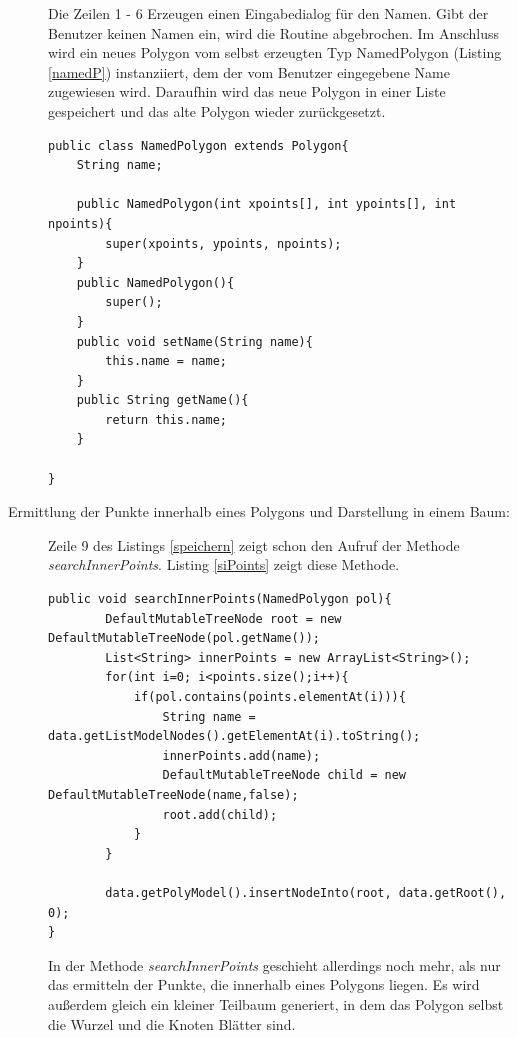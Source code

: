 \begin{description}
Die Zeilen 1 - 6 Erzeugen einen Eingabedialog für den Namen. Gibt der Benutzer keinen Namen ein, wird die Routine abgebrochen. Im Anschluss wird ein neues Polygon vom selbst erzeugten Typ NamedPolygon (Listing \ref{namedP}) instanziiert, dem der vom Benutzer eingegebene Name zugewiesen wird. Daraufhin wird das neue Polygon in einer Liste gespeichert und das alte Polygon wieder zurückgesetzt. 
\begin{lstlisting}[captionpos=b, caption=Klassendefinition des NamedPolygon, label=namedP]
public class NamedPolygon extends Polygon{
    String name;

    public NamedPolygon(int xpoints[], int ypoints[], int npoints){
        super(xpoints, ypoints, npoints);
    }
    public NamedPolygon(){
        super();
    }
    public void setName(String name){
        this.name = name;
    }
    public String getName(){
        return this.name;
    }

}
\end{lstlisting}

\item[Ermittlung der Punkte innerhalb eines Polygons und Darstellung in einem Baum:] Zeile 9 des Listings \ref{speichern} zeigt schon den Aufruf der Methode \emph{searchInnerPoints}. Listing \ref{siPoints} zeigt diese Methode.
\begin{lstlisting}[captionpos=b, caption=Methode searchInnerPoints, label=siPoints]
public void searchInnerPoints(NamedPolygon pol){
        DefaultMutableTreeNode root = new DefaultMutableTreeNode(pol.getName());
        List<String> innerPoints = new ArrayList<String>();
        for(int i=0; i<points.size();i++){
            if(pol.contains(points.elementAt(i))){
                String name = data.getListModelNodes().getElementAt(i).toString();
                innerPoints.add(name);
                DefaultMutableTreeNode child = new DefaultMutableTreeNode(name,false);
                root.add(child);
            }
        }
        
        data.getPolyModel().insertNodeInto(root, data.getRoot(), 0);
}
\end{lstlisting}

In der Methode \emph{searchInnerPoints} geschieht allerdings noch mehr, als nur das ermitteln der Punkte, die innerhalb eines Polygons liegen. Es wird außerdem gleich ein kleiner Teilbaum generiert, in dem das Polygon  selbst die Wurzel und die Knoten Blätter sind.

\end{description}

\begin{lstlisting}[captionpos=b, caption=Mehr Text, label=code]

\end{lstlisting}
